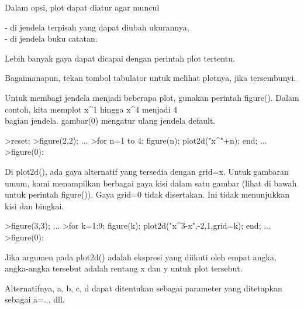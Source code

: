 \documentclass{article}
\begin{document}
\begin{eulernotebook}
\begin{eulercomment}
\begin{eulercomment}
\begin{eulercomment}
\begin{eulercomment}
\begin{eulercomment}
\begin{eulercomment}
\begin{eulercomment}
Dalam  opsi,  plot  dapat  diatur  agar  muncul

- di jendela terpisah yang dapat diubah ukurannya,\\
- di jendela buku catatan.

Lebih  banyak  gaya  dapat  dicapai  dengan  perintah  plot  tertentu.

Bagaimanapun,  tekan  tombol  tabulator  untuk  melihat  plotnya,
jika  tersembunyi.

Untuk  membagi  jendela  menjadi  beberapa  plot,  gunakan  perintah
figure(). Dalam  contoh,  kita  memplot  x\textasciicircum{}1  hingga  x\textasciicircum{}4  menjadi  4\\
bagian  jendela.  gambar(0)  mengatur  ulang  jendela  default.\\
\end{eulercomment}
\begin{eulerttcomment}
 
\end{eulerttcomment}
\begin{eulerprompt}
>reset;
>figure(2,2); ...
>for n=1 to 4; figure(n); plot2d("x^"+n); end; ...
>figure(0):
\end{eulerprompt}
\begin{eulercomment}
Di plot2d(), ada gaya alternatif yang tersedia dengan grid=x. Untuk
gambaran umum, kami menampilkan berbagai gaya kisi dalam satu gambar
(lihat di bawah untuk perintah figure()). Gaya grid=0 tidak
disertakan. Ini tidak menunjukkan kisi dan bingkai.
\end{eulercomment}
\begin{eulerprompt}
>figure(3,3); ...
>for k=1:9; figure(k); plot2d("x^3-x",-2,1,grid=k); end; ...
>figure(0):
\end{eulerprompt}
\begin{eulercomment}
Jika argumen pada plot2d() adalah ekspresi yang diikuti oleh empat
angka, angka-angka tersebut adalah rentang x dan y untuk plot
tersebut.


Alternatifnya,  a,  b,  c,  d  dapat  ditentukan  sebagai  parameter
yang  ditetapkan  sebagai  a=...  dll.


\end{eulercomment}
\end{eulercomment}
\end{eulercomment}
\end{eulercomment}
\end{eulercomment}
\end{eulercomment}
\end{eulercomment}
\end{eulernotebook}
\end{document}

